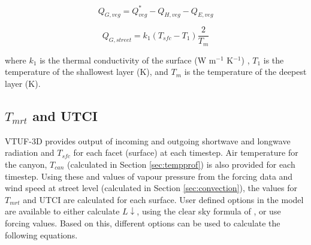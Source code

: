 \documentclass[final,3p,times,authoryear]{elsarticle}
\begin{document}
\begin{equation}\label{eq:qgvtuf}
 Q_{G,veg} =  Q^{*}_{veg} - Q_{H,veg} - Q_{E,veg}
\end{equation}

\begin{equation}\label{eq:qgtuf}
 Q_{G,street} = k_{1}  ( T_{sfc} - T_{1} ) \frac {2}{T_{m}}
\end{equation}

where $k_{1}$ is the thermal conductivity of the surface (W m$^{-1}$ K$^{-1}$) , $T_{1}$ is the temperature of the shallowest layer (K), and $T_{m}$ is the temperature of the deepest layer (K).



\subsection{$T_{mrt}$ and UTCI}\label{sec:tmrtutci}

VTUF-3D provides output of incoming and outgoing shortwave and longwave radiation and $T_{sfc}$ for each facet (surface) at each timestep. Air temperature for the canyon, $T_{can}$ (calculated in Section \ref{sec:tempprof}) is also provided for each timestep. Using these and values of vapour pressure from the forcing data and wind speed at street level (calculated in Section \ref{sec:convection}), the values for $T_{mrt}$ and UTCI are calculated for each surface. User defined options in the model are available to either calculate $L\downarrow$, using the clear sky formula of \cite{Prata1996}, or use forcing values. Based on this, different options can be used to calculate the following equations.
\end{document}
